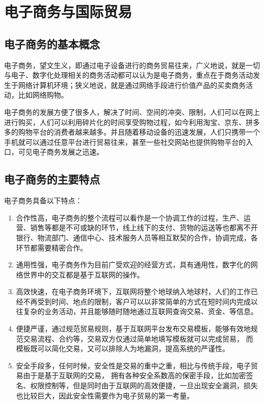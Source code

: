 \chapter{电子商务与国际贸易}
\section{电子商务的基本概念}
电子商务，望文生义，即通过电子设备进行的商务贸易往来，广义地说，就是一切与电子、数字化处理相关的商务活动都可以认为是电子商务，重点在于商务活动发生于网络计算机环境；狭义地说，就是通过网络手段进行价值产品的买卖商务活动，比如网络购物。

电子商务的发展方便了很多人，解决了时间、空间的冲突、限制，人们可以在网上进行购买，人们可以利用碎片化的时间享受购物过程，如今利用淘宝、京东、拼多多的购物平台的消费者越来越多。并且随着移动设备的迅速发展，人们只携带一个手机就可以通过任意平台进行贸易往来，甚至一些社交网站也提供购物平台的入口，可见电子商务发展之迅速。

\section{电子商务的主要特点}
电子商务具备以下特点：
\begin{enumerate}[(1)]
\setlength{\itemsep}{0ex}
\item 合作性高，电子商务的整个流程可以看作是一个协调工作的过程，生产、运营、销售等都是不可或缺的环节，线上线下的支付、货物的运送等也都离不开银行、物流部门、通信中心、技术服务人员等相互默契的合作，协调完成，各环节都需要精密合作。
\item 通用性强，电子商务作为目前广受欢迎的经营方式，具有通用性，数字化的网络世界中的交互都是基于互联网的操作。
\item 高效快速，在电子商务环境下，互联网将整个地球纳入地球村，人们的工作已经不再受到时间、地点的限制，客户可以以非常简单的方式在短时间内完成以往复杂的业务活动，并且能够随时随地通过互联网查询交易、资金、等信息。
\item 便捷严谨，通过规范贸易规则，基于互联网平台发布交易模板，能够有效地规范交易流程、合约等，交易双方仅通过简单地填写模板就可以完成贸易，
而模板既可以简化交易，又可以排除人为地漏洞，提高系统的严谨性。
\item 安全手段多，任何时候，安全性是交易的重中之重，相比与传统手段，电子贸易由于是基于互联网的交易，
拥有各种安全系数高的保密手段，比如加密签名、权限控制等，但是同时由于互联网的高效便捷，一旦出现安全漏洞，损失也比较巨大，因此安全性需要作为电子贸易的第一考量。
\end{enumerate}

